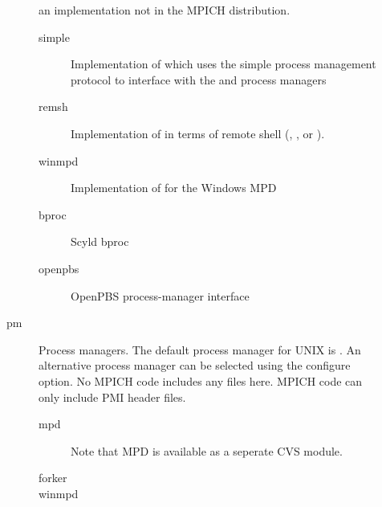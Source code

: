 \documentclass{article}
\begin{document}
\begin{description}
\begin{description}
    an implementation not in the MPICH distribution.
    \begin{description}
          \item[simple]Implementation of  which uses the simple
            process management protocol to interface with the  and
             process managers
          \item[remsh]Implementation of  in terms of remote
            shell (, , or ).
          \item[winmpd]Implementation of  for the Windows MPD
          \item[bproc]Scyld bproc
          \item[openpbs]OpenPBS process-manager interface
    \end{description}
    \item[pm]Process managers.  The default process manager for UNIX is
      .  An alternative process manager can be selected using the
       configure option.  No MPICH code includes
      any files here.  MPICH code can only include PMI header files.
        \begin{description}
        \item[mpd]Note that MPD is available as a seperate CVS module.
        \item[forker]
        \item[winmpd]
        \end{description}


\end{description}
\end{description}
\end{document}
